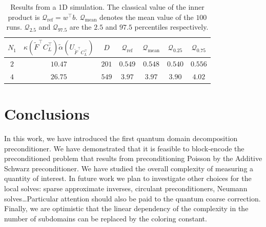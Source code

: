 \documentclass[onefignum,onetabnum]{siamart251216}
\begin{document}
\begin{table}[htbp]
\caption{Results from a 1D simulation. The classical value of the inner product is $\mathcal{Q}_{\text{ref}}=w^\top b$. $\mathcal{Q}_{\text{mean}}$ denotes the mean value of the $100$ runs. $\mathcal{Q}_{2.5}$ and $\mathcal{Q}_{97.5}$ are the $2.5$ and $97.5$ percentiles respectively.}\label{tab:tab_inner_product}
\begin{center}
\begin{tabular}{|c | c | c | c | c | c | c |}
 \hline
 $N_1$ & $\kappa(\tilde{F}^\top C_L^\top) \tilde{\alpha}(U_{\tilde{F}^\top C_L^\top})$ & $D$ & $\mathcal{Q}_{\text{ref}}$ & $\mathcal{Q}_{\text{mean}}$ & $\mathcal{Q}_{0.25}$ & $\mathcal{Q}_{0.75}$ \\ [0.5ex]
 \hline\hline
 $2$ & $10.47$ & $201$ & $0.549 $ & $0.548$ & $0.540$ & $0.556$  \\
 \hline
 $4$ & $26.75$ & $549$ & $3.97$ & $3.97$ & $3.90$ & $4.02$  \\
 \hline
\end{tabular}
\end{center}
\end{table}


\section{Conclusions}
\label{sec:conclusions}
 In this work, we have introduced the first quantum domain decomposition preconditioner. We have demonstrated that it is feasible to block-encode the preconditioned problem that results from preconditioning Poisson by the Additive Schwarz preconditioner. We have studied the overall complexity of measuring a quantity of interest. In future work we plan to investigate other choices for the local solves: sparse approximate inverses, circulant preconditioners, Neumann solves\dots Particular attention should also be paid to the quantum coarse correction. Finally, we are optimistic that the linear dependency of the complexity in the number of subdomains can be replaced by the coloring constant. 




\end{document}
